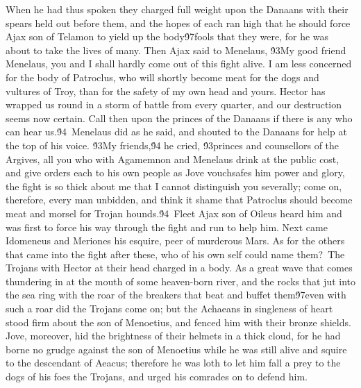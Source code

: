 {When he had thus spoken they charged full weight upon the Danaans with their spears held out before them, and the hopes of each ran high that he should force Ajax son of Telamon to yield up the body\'97fools that they were, for he was about to take the lives of many. Then Ajax said to Menelaus, \'93My good friend Menelaus, you and I shall hardly come out of this fight alive. I am less concerned for the body of Patroclus, who will shortly become meat for the dogs and vultures of Troy, than for the safety of my own head and yours. Hector has wrapped us round in a storm of battle from every quarter, and our destruction seems now certain. Call then upon the princes of the Danaans if there is any who can hear us.\'94\
Menelaus did as he said, and shouted to the Danaans for help at the top of his voice. \'93My friends,\'94 he cried, \'93princes and counsellors of the Argives, all you who with Agamemnon and Menelaus drink at the public cost, and give orders each to his own people as Jove vouchsafes him power and glory, the fight is so thick about me that I cannot distinguish you severally; come on, therefore, every man unbidden, and think it shame that Patroclus should become meat and morsel for Trojan hounds.\'94\
Fleet Ajax son of Oileus heard him and was first to force his way through the fight and run to help him. Next came Idomeneus and Meriones his esquire, peer of murderous Mars. As for the others that came into the fight after these, who of his own self could name them?\
The Trojans with Hector at their head charged in a body. As a great wave that comes thundering in at the mouth of some heaven-born river, and the rocks that jut into the sea ring with the roar of the breakers that beat and buffet them\'97even with such a roar did the Trojans come on; but the Achaeans in singleness of heart stood firm about the son of Menoetius, and fenced him with their bronze shields. Jove, moreover, hid the brightness of their helmets in a thick cloud, for he had borne no grudge against the son of Menoetius while he was still alive and squire to the descendant of Aeacus; therefore he was loth to let him fall a prey to the dogs of his foes the Trojans, and urged his comrades on to defend him.\
}
